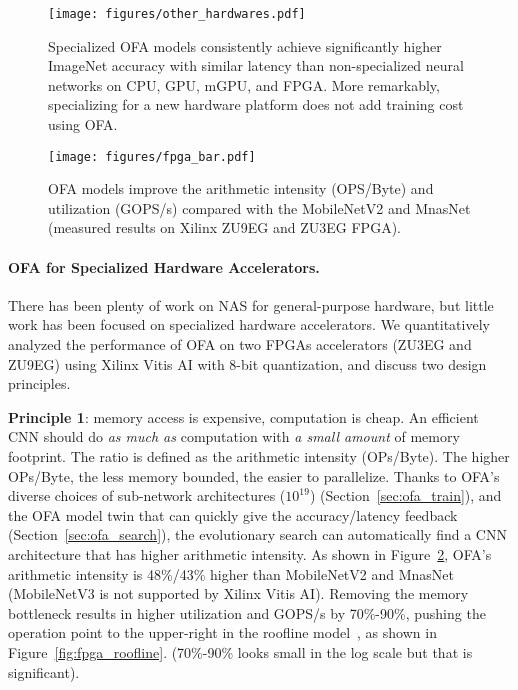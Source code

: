 \documentclass{article} \usepackage{iclr2020_conference,times}
\newcommand{\myparagraph}[1]{\vspace{-3pt}\paragraph{#1}}
\begin{document}
\begin{figure}[t]
    \centering
    \vspace{-25pt}
    \texttt{[image: figures/other\_hardwares.pdf]}
    \caption{
        Specialized OFA models consistently achieve significantly higher ImageNet accuracy with similar latency than non-specialized neural networks on CPU, GPU, mGPU, and FPGA. More remarkably, specializing for a new hardware platform does not add training cost using OFA.
    }
    \label{fig:specialized_different_hardwares}
\end{figure}

\begin{figure}[t]
    \centering
    \texttt{[image: figures/fpga\_bar.pdf]}
    \caption{OFA models improve the arithmetic intensity (OPS/Byte) and utilization (GOPS/s) compared with the MobileNetV2 and MnasNet (measured results on Xilinx ZU9EG and ZU3EG FPGA). 
    }
    \label{fig:fpga_numbers}
\end{figure}


\myparagraph{OFA for Specialized Hardware Accelerators.}
There has been plenty of work on NAS for general-purpose hardware, but little work has been focused on specialized hardware accelerators. We quantitatively analyzed the performance of OFA on two FPGAs accelerators (ZU3EG and ZU9EG) using Xilinx Vitis AI with 8-bit quantization, and discuss two design principles.  

\textbf{Principle 1}: memory access is expensive, computation is cheap. An efficient CNN should do \textit{as much as} computation with \textit{a small amount} of memory footprint. The ratio is defined as the arithmetic intensity (OPs/Byte). The higher OPs/Byte, the less memory bounded, the easier to parallelize. Thanks to OFA's diverse choices of sub-network architectures ($10^{19}$) (Section~\ref{sec:ofa_train}), and the OFA model twin that can quickly give the accuracy/latency feedback (Section~\ref{sec:ofa_search}), the evolutionary search can automatically find a CNN architecture that has higher arithmetic intensity. As shown in Figure~\ref{fig:fpga_numbers}, OFA's arithmetic intensity is 48\%/43\% higher than MobileNetV2 and MnasNet (MobileNetV3 is not supported by Xilinx Vitis AI). Removing the memory bottleneck results in higher utilization and GOPS/s by 70\%-90\%, pushing the operation point to the upper-right in the roofline model~\citep{williams2009roofline}, as shown in Figure~\ref{fig:fpga_roofline}. (70\%-90\% looks small in the log scale but that is significant). 
\end{document}
